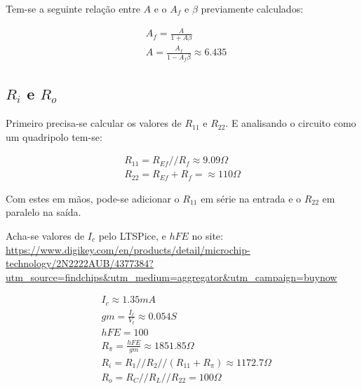 Tem-se a seguinte relação entre $A$ e o $A_f$ e $\beta$ previamente calculados:

\begin{equation}
    \begin{aligned}
         & A_f = \frac{A}{1 + A\beta}                  \\
         & A = \frac{A_f}{1 - A_f \beta} \approx 6.435
    \end{aligned}
\end{equation}

\subsection{$R_i$ e $R_o$}

Primeiro precisa-se calcular os valores de $R_{11}$ e $R_{22}$. E analisando o circuito como um quadripolo tem-se:

\begin{equation}
    \begin{aligned}
        R_{11} = R_{Ef} // R_f \approx 9.09 \varOmega \\
        R_{22} = R_{Ef} + R_f = \approx 110 \varOmega
    \end{aligned}
\end{equation}

Com estes em mãos, pode-se adicionar o $R_{11}$ em série na entrada e o $R_{22}$ em paralelo na saída.

Acha-se valores de $I_c$ pelo LTSPice, e $hFE$ no site: \url{https://www.digikey.com/en/products/detail/microchip-technology/2N2222AUB/4377384?utm_source=findchips&utm_medium=aggregator&utm_campaign=buynow}

\begin{equation}
    \begin{aligned}
         & I_c \approx 1.35mA                                              \\
         & gm = \frac{I_c}{V_t} \approx 0.054S                             \\
         & hFE = 100                                                       \\
         & R_{\pi} = \frac{hFE}{gm} \approx 1851.85 \varOmega              \\
         & R_i = R_1 // R_2 // (R_{11} + R_{\pi}) \approx 1172.7 \varOmega \\
         & R_o = R_C // R_L // R_{22} = 100 \varOmega
    \end{aligned}
\end{equation}

